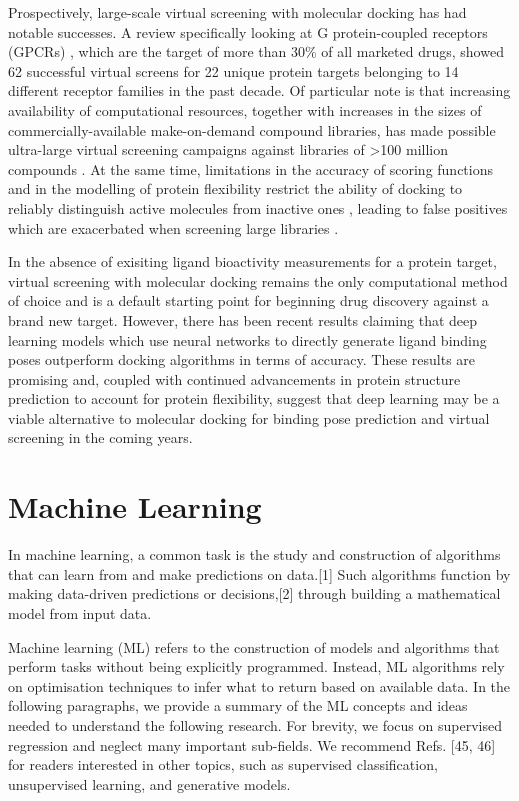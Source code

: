 Prospectively, large-scale virtual screening with molecular docking has had notable successes. A review specifically looking at G protein-coupled receptors (GPCRs) \cite{Ballante2021DockingGPCR}, which are the target of more than 30\% of all marketed drugs, showed 62 successful virtual screens for 22 unique protein targets belonging to 14 different receptor families in the past decade. Of particular note is that increasing availability of computational resources, together with increases in the sizes of commercially-available make-on-demand compound libraries, has made possible ultra-large virtual screening campaigns against libraries of >100 million compounds  \cite{Lyu2019UltraLargeDocking, Alon2021sigma, Fink2022Alpha}. At the same time, limitations in the accuracy of scoring functions and in the modelling of protein flexibility \cite{Erickson2004flexibility, Antunes2015flexibility} restrict the ability of docking to reliably distinguish active molecules from inactive ones \cite{Llanos2021StrengthsAndWeaknesses, Macip2022HasteMakesWaste}, leading to false positives which are exacerbated when screening large libraries \cite{Lyu2023Expansion}.

In the absence of exisiting ligand bioactivity measurements for a protein target, virtual screening with molecular docking remains the only computational method of choice and is a default starting point for beginning drug discovery against a brand new target. However, there has been recent results claiming that deep learning models which use neural networks to directly generate ligand binding poses \cite{Stark2022equibind, corso2023diffdock} outperform docking algorithms in terms of accuracy. These results are promising and, coupled with continued advancements in protein structure prediction to account for protein flexibility, suggest that deep learning may be a viable alternative to molecular docking for binding pose prediction and virtual screening in the coming years.

\section{Machine Learning} \label{ch:machine_learning}

In machine learning, a common task is the study and construction of algorithms that can learn from and make predictions on data.[1] Such algorithms function by making data-driven predictions or decisions,[2] through building a mathematical model from input data.

Machine learning (ML) refers to the construction of models and algorithms that perform tasks without being explicitly programmed. Instead, ML algorithms rely on optimisation techniques to infer what to return based on available data. In the following paragraphs, we provide a summary of the ML concepts and ideas needed to understand the following research. For brevity, we focus on supervised regression and neglect many important sub-fields. We recommend Refs. [45, 46] for readers interested in other topics, such as supervised classification, unsupervised learning, and generative models.

